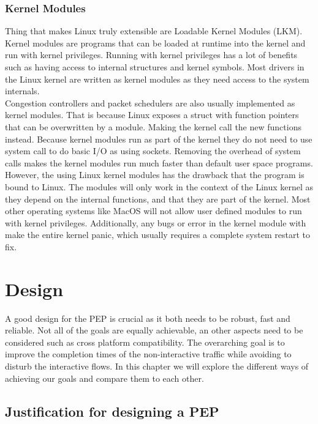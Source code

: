 \documentclass[a4paper,english, 11pt]{report}
\begin{document}
\subsection{Kernel Modules}
Thing that makes Linux truly extensible are Loadable Kernel Modules (LKM). Kernel modules are programs that can be loaded at runtime into the kernel and run with kernel privileges. Running with kernel privileges has a lot of benefits such as having access to internal structures and kernel symbols. Most drivers in the Linux kernel are written as kernel modules as they need access to the system internals.\\

Congestion controllers and packet schedulers are also usually implemented as kernel modules. That is because Linux exposes a struct with function pointers that can be overwritten by a module. Making the kernel call the new functions instead. Because kernel modules run as part of the kernel they do not need to use system call to do basic I/O as using sockets. Removing the overhead of system calls makes the kernel modules run much faster than default user space programs.\\

However, the using Linux kernel modules has the drawback that the program is bound to Linux. The modules will only work in the context of the Linux kernel as they depend on the internal functions, and that they are part of the kernel. Most other operating systems like MacOS will not allow user defined modules to run with kernel privileges. Additionally, any bugs or error in the kernel module with make the entire kernel panic, which usually requires a complete system restart to fix.

\chapter{Design}
A good design for the PEP is crucial as it both needs to be robust, fast and reliable. Not all of the goals are equally achievable, an other aspects need to be considered such as cross platform compatibility. The overarching goal is to improve the completion times of the non-interactive traffic while avoiding to disturb the interactive flows.  In this chapter we will explore the different ways of achieving our goals and compare them to each other. 

\section{Justification for designing a PEP}
\end{document}
